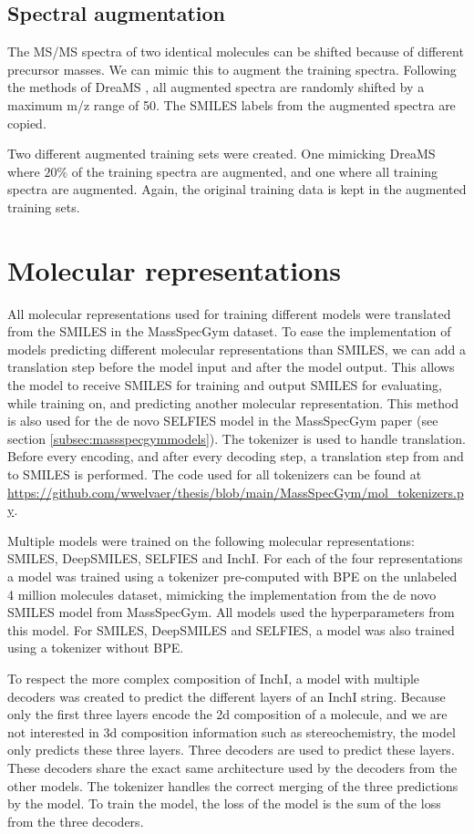\subsection{Spectral augmentation}

The \ac{MS/MS} spectra of two identical molecules can be shifted because of different precursor masses.
We can mimic this to augment the training spectra.
Following the methods of DreaMS \cite{bushuiev2024emergence}, all augmented spectra are randomly shifted by a maximum m/z range of 50.
The SMILES labels from the augmented spectra are copied.

Two different augmented training sets were created. One mimicking DreaMS where $20\%$ of the training spectra are augmented, and one where all training spectra are augmented.
Again, the original training data is kept in the augmented training sets.

\section{Molecular representations}
\label{sec:representations}

All molecular representations used for training different models were translated from the SMILES in the MassSpecGym dataset.
To ease the implementation of models predicting different molecular representations than SMILES,
we can add a translation step before the model input and after the model output.
This allows the model to receive SMILES for training and output SMILES for evaluating,
while training on, and predicting another molecular representation.
This method is also used for the de novo SELFIES model in the MassSpecGym paper (see section \ref{subsec:massspecgymmodels}).
The tokenizer is used to handle translation. Before every encoding, and after every decoding step, a translation step from and to SMILES is performed.
The code used for all tokenizers can be found at \url{https://github.com/wwelvaer/thesis/blob/main/MassSpecGym/mol_tokenizers.py}.

Multiple models were trained on the following molecular representations: SMILES, DeepSMILES, SELFIES and InchI.
For each of the four representations a model was trained using a tokenizer pre-computed with \ac{BPE} on the unlabeled 4 million molecules dataset,
mimicking the implementation from the de novo SMILES model from MassSpecGym. All models used the hyperparameters from this model.
For SMILES, DeepSMILES and SELFIES, a model was also trained using a tokenizer without \ac{BPE}.

To respect the more complex composition of InchI, a model with multiple decoders was created to predict the different layers of an InchI string.
Because only the first three layers encode the 2d composition of a molecule, and we are not interested in 3d composition information such as stereochemistry,
the model only predicts these three layers.
Three decoders are used to predict these layers. These decoders share the exact same architecture used by the decoders from the other models.
The tokenizer handles the correct merging of the three predictions by the model.
To train the model, the loss of the model is the sum of the loss from the three decoders.

